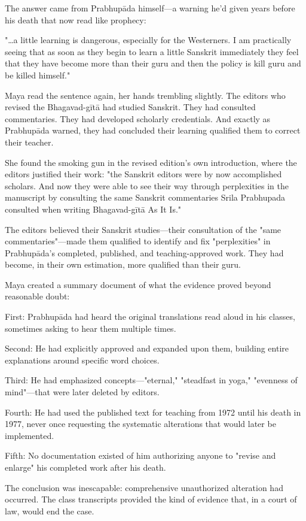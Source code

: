 \documentclass[12pt,twoside]{book}
\begin{document}
The answer came from Prabhupāda himself—a warning he'd given years before his death that now read like prophecy:

"\ldots{}a little learning is dangerous, especially for the Westerners. I am practically seeing that as soon as they begin to learn a little Sanskrit immediately they feel that they have become more than their guru and then the policy is kill guru and be killed himself."

Maya read the sentence again, her hands trembling slightly. The editors who revised the Bhagavad-gītā had studied Sanskrit. They had consulted commentaries. They had developed scholarly credentials. And exactly as Prabhupāda warned, they had concluded their learning qualified them to correct their teacher.

She found the smoking gun in the revised edition's own introduction, where the editors justified their work: "the Sanskrit editors were by now accomplished scholars. And now they were able to see their way through perplexities in the manuscript by consulting the same Sanskrit commentaries Srila Prabhupada consulted when writing Bhagavad-gītā As It Is."

The editors believed their Sanskrit studies—their consultation of the "same commentaries"—made them qualified to identify and fix "perplexities" in Prabhupāda's completed, published, and teaching-approved work. They had become, in their own estimation, more qualified than their guru.

Maya created a summary document of what the evidence proved beyond reasonable doubt:

First: Prabhupāda had heard the original translations read aloud in his classes, sometimes asking to hear them multiple times.

Second: He had explicitly approved and expanded upon them, building entire explanations around specific word choices.

Third: He had emphasized concepts—"eternal," "steadfast in yoga," "evenness of mind"—that were later deleted by editors.

Fourth: He had used the published text for teaching from 1972 until his death in 1977, never once requesting the systematic alterations that would later be implemented.

Fifth: No documentation existed of him authorizing anyone to "revise and enlarge" his completed work after his death.

The conclusion was inescapable: comprehensive unauthorized alteration had occurred. The class transcripts provided the kind of evidence that, in a court of law, would end the case.
\end{document}
